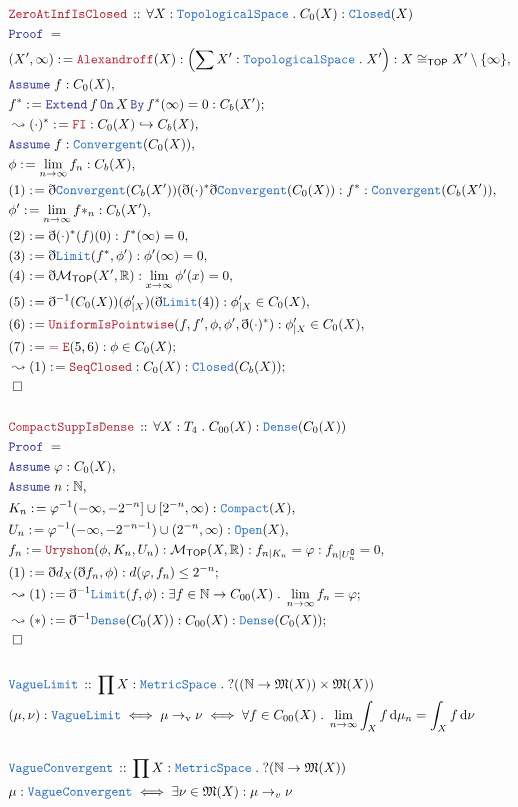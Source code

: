\documentclass[12pt]{scrartcl}
\newcommand{\TYPE}[1]{\textcolor{NavyBlue}{\mathtt{#1}}}
\newcommand{\LOGIC}[1]{\textcolor{Blue}{\mathtt{#1}}}
\newcommand{\THM}[1]{\textcolor{Maroon}{\mathtt{#1}}}
\renewcommand{\.}{\; . \;}
\newcommand{\de}{: \kern 0.1pc =}
\newcommand{\Theorem}[2]{& \THM{#1} \, :: \, #2 \\ & \Proof = \\ }
\newcommand{\DeclareType}[2]{& \TYPE{#1} \, :: \, #2 \\}
\newcommand{\DefineType}[3]{& #1 : \TYPE{#2} \iff #3 \\}
\newcommand{\DefineNamedType}[4]{& #1 : \TYPE{#2} \iff #3 \iff #4 \\}
\newcommand{\Reals}{\mathbb{R} }
\newcommand{\Nat}{\mathbb{N} }
\newcommand{\ToInj}{\hookrightarrow}
\renewcommand{\c}{\complement}
\newcommand{\Say}[3]{& #1 \de #2 : #3, \\}
\newcommand{\Conclude}[3]{& #1 \de #2 : #3; \\}
\newcommand{\Derive}[3]{& \leadsto #1 \de #2 : #3, \\}
\newcommand{\DeriveConclude}[3]{& \leadsto #1 \de #2 : #3 ; \\}
\newcommand{\A}{\LOGIC{Assume} \;}
\newcommand{\Assume}[2]{& \A #1 : #2, \\}
\newcommand{\QED}{\; \square}
\newcommand{\EndProof}{& \QED \\}
\newcommand{\ByDef}{\eth}
\newcommand{\Proof}{\LOGIC{Proof} \; }
\newcommand{\Mor}{\mathcal{M}}
\newcommand{\TS}{\TYPE{TopologicalSpace}}
\newcommand{\MS}{\TYPE{MetricSpace}}
\newcommand{\Compact}{\TYPE{Compact}}
\newcommand{\Dense}{\TYPE{Dense}}
\newcommand{\TOP}{ \mathsf{TOP}  }
\begin{document}
\newpage
\begin{align*}
\Theorem{ ZeroAtInfIsClosed }{ \forall X : \TS \.  C_0(X) : \TYPE{Closed}(X) }
\Say{(X',\infty)}{ \THM{Alexandroff}(X)  }{ \left( \sum X' : \TS \. X' \right) : X \cong_{\TOP} X' \setminus \{ \infty \}   }
\Assume{f}{C_0( X )}
\Conclude{f^*}{ \LOGIC{Extend} \, f \, \LOGIC{On} \, X  \, \LOGIC{By} \, f^*(\infty) = 0  }{C_b(X')}
\Derive{(\cdot)^*}{ \THM{FI}  }{ C_0(X) \ToInj C_b(X)  }
\Assume{f}{ \TYPE{Convergent}(C_0(X)) }
\Say{\phi}{ \lim_{n \to \infty} f_n  }{C_b(X)}
\Say{(1)}{ \ByDef \TYPE{Convergent}(C_b(X'))(\ByDef (\cdot)^* \ByDef \TYPE{Convergent}(C_0(X) ) }{ f^* : \TYPE{Convergent}(C_b(X'))  }
\Say{ \phi'  }{ \lim_{n \to \infty} f*_n  }{ C_b(X') }
\Say{ (2)    }{ \ByDef (\cdot)^*(f)(0) }{ f^*(\infty) = 0 }
\Say{ (3) }{ \ByDef\TYPE{Limit}( f^*,\phi'  )  }{ \phi'(\infty) = 0  }
\Say{ (4)  }{ \ByDef\mathcal{M}_{\TOP}( X', \Reals  )}{\lim_{x \to \infty} \phi'(x) = 0 }
\Say{ (5)  }{ \ByDef^{-1}(C_0(X))(\phi'_{|X})( \ByDef\TYPE{Limit}(4) )}{ \phi'_{|X } \in C_0(X)}
\Say{ (6)  }{ \THM{UniformIsPointwise}(f,f',\phi,\phi',\ByDef (\cdot)^*)     }{ \phi'_{|X} \in C_0(X)  }
\Conclude{  (7)  }{ \THM{=E}(5,6) }{ \phi \in C_0(X)}
\DeriveConclude{ (1) }{ \THM{SeqClosed}  }{ C_0(X) : \TYPE{Closed}(C_b(X)) }
\EndProof 
\\
\Theorem{ CompactSuppIsDense  }{ \forall X : T_4 \. C_{00}(X) : \TYPE{Dense}(C_{0}(X)) }
\Assume{ \varphi }{  C_{0}(X)  }
\Assume{ n }{ \Nat }
\Say{K_n}{ \varphi^{-1}(-\infty,-2^{-n}] \cup [2^{-n}, \infty )}{ \Compact(X)  }
\Say{U_n}{ \varphi^{-1}( - \infty, -2^{-n - 1} ) \cup ( 2^{-n}, \infty)  }{ \TYPE{Open}(X) }
\Say{f_n}{ \THM{Uryshon}(\phi,K_n ,U_n) }{  \Mor_{\TOP}(X, \Reals) : f_{n|K_n} = \varphi : f_{n|U_n^\c} = 0    }
\Conclude{ (1)  }{\ByDef d_X (\ByDef f_n, \phi )}{ d(\varphi,f_n) \le 2^{-n}  }
\DeriveConclude{ (1) }{ \ByDef^{-1} \TYPE{Limit} ( f, \phi   )  }{ \exists f \in \Nat \to C_{00}(X) \. \lim_{n \to \infty} f_n = \varphi   }
\DeriveConclude{ (*) }{\ByDef^{-1}\Dense(C_0(X)) }{C_{00}(X) : \Dense(C_{0}(X))}
\EndProof
\\
\DeclareType{VagueLimit}{ \prod X  : \MS \. ?((\Nat \to \mathfrak{M}(X) ) \times \mathfrak{M}(X)  )  }
\DefineNamedType{ (\mu,\nu )  }{VagueLimit}{ \mu \to_{\mathrm{v}} \nu  }{  \forall f \in C_{00}(X) \. \lim_{n \to \infty} \int_X f \, \mathrm{d}\mu_n = \int_X f \, \mathrm{d}\nu   }
\\
\DeclareType{VagueConvergent}{ \prod X : \MS \. ?(\Nat \to \mathfrak{M}(X))  }
\DefineType{\mu}{VagueConvergent}{ \exists \nu \in \mathfrak{M}(X) : \mu \to_v \nu  }
\end{align*}
\newpage
\end{document}

